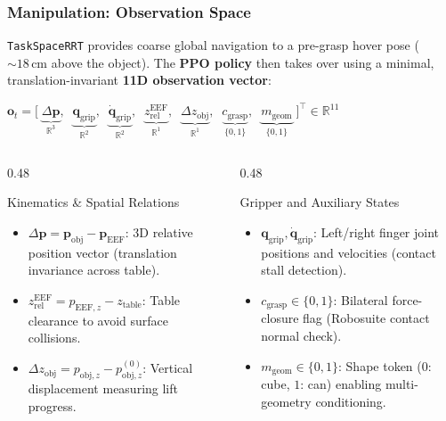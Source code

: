 \documentclass[10pt]{beamer}
\begin{document}
\begin{frame}
    \frametitle{Manipulation: Observation Space}
    \small
    \texttt{TaskSpaceRRT} provides coarse global navigation to a pre-grasp hover pose ($\sim 18\,\text{cm}$ above the object). The \textbf{PPO policy} then takes over using a minimal, translation-invariant \textbf{11D observation vector}:
    
    \vspace{0.15cm}
    \centering
    $\mathbf{o}_t = \Big[\; \underbrace{\Delta\mathbf{p}}_{\mathbb{R}^3},\;\; \underbrace{\mathbf{q}_{\text{grip}}}_{\mathbb{R}^2},\;\; \underbrace{\dot{\mathbf{q}}_{\text{grip}}}_{\mathbb{R}^2},\;\; \underbrace{z_{\text{rel}}^{\text{EEF}}}_{\mathbb{R}^1},\;\; \underbrace{\Delta z_{\text{obj}}}_{\mathbb{R}^1},\;\; \underbrace{c_{\text{grasp}}}_{\{0,1\}},\;\; \underbrace{m_{\text{geom}}}_{\{0,1\}} \;\Big]^\top \in \mathbb{R}^{11}$
    \vspace{0.2cm}
    \begin{columns}[T]
        \begin{column}{0.48\textwidth}
            \begin{block}{Kinematics \& Spatial Relations}
                \begin{itemize}\footnotesize
                    \item $\Delta\mathbf{p} = \mathbf{p}_{\text{obj}} - \mathbf{p}_{\text{EEF}}$: 3D relative position vector (translation invariance across table).
                    \item $z_{\text{rel}}^{\text{EEF}} = p_{\text{EEF}, z} - z_{\text{table}}$: Table clearance to avoid surface collisions.
                    \item $\Delta z_{\text{obj}} = p_{\text{obj}, z} - p_{\text{obj}, z}^{(0)}$: Vertical displacement measuring lift progress.
                \end{itemize}
            \end{block}
        \end{column}
        \begin{column}{0.48\textwidth}
            \begin{block}{Gripper and Auxiliary States}
                \begin{itemize}\footnotesize
                    \item $\mathbf{q}_{\text{grip}}, \dot{\mathbf{q}}_{\text{grip}}$: Left/right finger joint positions and velocities (contact stall detection).
                    \item $c_{\text{grasp}} \in \{0, 1\}$: Bilateral force-closure flag (Robosuite contact normal check).
                    \item $m_{\text{geom}} \in \{0, 1\}$: Shape token ($0$: cube, $1$: can) enabling multi-geometry conditioning.
                \end{itemize}
            \end{block}
        \end{column}
    \end{columns}
\end{frame}
\end{document}
